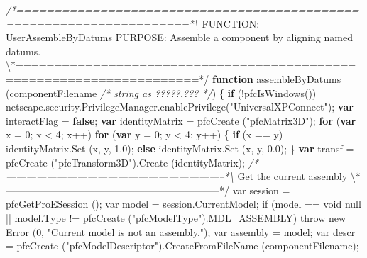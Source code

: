\documentclass[]{article}
\newenvironment{Shaded}{}{}
\newcommand{\KeywordTok}[1]{\textcolor[rgb]{0.00,0.44,0.13}{\textbf{{#1}}}}
\newcommand{\DecValTok}[1]{\textcolor[rgb]{0.25,0.63,0.44}{{#1}}}
\newcommand{\FloatTok}[1]{\textcolor[rgb]{0.25,0.63,0.44}{{#1}}}
\newcommand{\StringTok}[1]{\textcolor[rgb]{0.25,0.44,0.63}{{#1}}}
\newcommand{\CommentTok}[1]{\textcolor[rgb]{0.38,0.63,0.69}{\textit{{#1}}}}
\newcommand{\OtherTok}[1]{\textcolor[rgb]{0.00,0.44,0.13}{{#1}}}
\newcommand{\FunctionTok}[1]{\textcolor[rgb]{0.02,0.16,0.49}{{#1}}}
\newcommand{\NormalTok}[1]{{#1}}
\begin{document}
\begin{Shaded}
\begin{Highlighting}[]
\CommentTok{/*=====================================================================*\textbackslash{}}
\NormalTok{FUNCTION: UserAssembleByDatums}
\NormalTok{PURPOSE:  Assemble a component by aligning named }\OtherTok{datums}\NormalTok{.         }
\NormalTok{\textbackslash{}*=====================================================================*}\OtherTok{/}
\KeywordTok{function} \FunctionTok{assembleByDatums} \NormalTok{(componentFilename }\CommentTok{/* string as ?????.??? */}\NormalTok{)}
\NormalTok{\{}
  \KeywordTok{if} \NormalTok{(!}\FunctionTok{pfcIsWindows}\NormalTok{())}
    \OtherTok{netscape}\NormalTok{.}\OtherTok{security}\NormalTok{.}\OtherTok{PrivilegeManager}\NormalTok{.}\FunctionTok{enablePrivilege}\NormalTok{(}\StringTok{"UniversalXPConnect"}\NormalTok{);}
  \KeywordTok{var} \NormalTok{interactFlag = }\KeywordTok{false}\NormalTok{;}
  \KeywordTok{var} \NormalTok{identityMatrix = }\FunctionTok{pfcCreate} \NormalTok{(}\StringTok{"pfcMatrix3D"}\NormalTok{);}
  \KeywordTok{for} \NormalTok{(}\KeywordTok{var} \NormalTok{x = }\DecValTok{0}\NormalTok{; x < }\DecValTok{4}\NormalTok{; x++)}
    \KeywordTok{for} \NormalTok{(}\KeywordTok{var} \NormalTok{y = }\DecValTok{0}\NormalTok{; y < }\DecValTok{4}\NormalTok{; y++)}
      \NormalTok{\{}
    \KeywordTok{if} \NormalTok{(x == y)}
      \OtherTok{identityMatrix}\NormalTok{.}\FunctionTok{Set} \NormalTok{(x, y, }\FloatTok{1.0}\NormalTok{);}
    \KeywordTok{else}
      \OtherTok{identityMatrix}\NormalTok{.}\FunctionTok{Set} \NormalTok{(x, y, }\FloatTok{0.0}\NormalTok{);}
      \NormalTok{\}}
  \KeywordTok{var} \NormalTok{transf = }\FunctionTok{pfcCreate} \NormalTok{(}\StringTok{"pfcTransform3D"}\NormalTok{).}\FunctionTok{Create} \NormalTok{(identityMatrix);}
\CommentTok{/*-----------------------------------------------------------------*\textbackslash{}}
  \NormalTok{Get the current assembly}
\NormalTok{\textbackslash{}*-----------------------------------------------------------------*}\OtherTok{/  }
\OtherTok{  var session = pfcGetProESession }\FloatTok{()}\OtherTok{;}
\OtherTok{  var model = session.CurrentModel;}
\OtherTok{  if }\FloatTok{(}\OtherTok{model == void null }\FloatTok{||}\OtherTok{ model.Type != pfcCreate }\FloatTok{(}\OtherTok{"pfcModelType"}\FloatTok{)}\OtherTok{.MDL_ASSEMBLY}\FloatTok{)}
\OtherTok{    throw new Error }\FloatTok{(}\OtherTok{0, "Current model is not an assembly."}\FloatTok{)}\OtherTok{;}
\OtherTok{  }
\OtherTok{  var assembly = model;}
\OtherTok{  }
\OtherTok{  var descr = }
\OtherTok{    pfcCreate }\FloatTok{(}\OtherTok{"pfcModelDescriptor"}\FloatTok{)}\OtherTok{.CreateFromFileName }\FloatTok{(}\OtherTok{componentFilename}\FloatTok{)}\OtherTok{;}

\end{Highlighting}
\end{Shaded}
\end{document}
